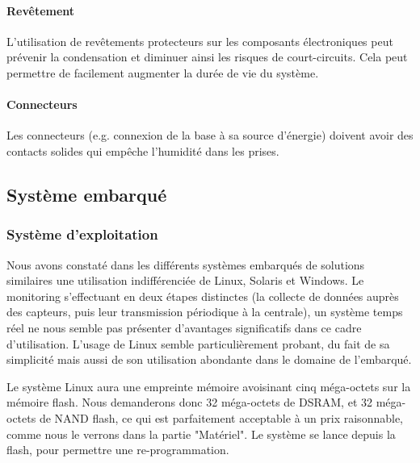\paragraph{Revêtement}

L'utilisation de revêtements protecteurs sur les composants électroniques peut prévenir la condensation et diminuer ainsi les risques de court-circuits. Cela peut permettre de facilement augmenter la durée de vie du système.

\paragraph{Connecteurs}

Les connecteurs (e.g. connexion de la base à sa source d'énergie) doivent avoir des contacts solides qui empêche l’humidité dans les prises.

\subsection{Système embarqué}

\subsubsection{Système d'exploitation}

Nous avons constaté dans les différents systèmes embarqués de solutions similaires une utilisation indifférenciée de Linux, Solaris et Windows\footnotemark. Le monitoring s'effectuant en deux étapes distinctes (la collecte de données auprès des capteurs, puis leur transmission périodique à la centrale), un système temps réel ne nous semble pas présenter d'avantages significatifs dans ce cadre d'utilisation. L'usage de Linux semble particulièrement probant, du fait de sa simplicité mais aussi de son utilisation abondante dans le domaine de l'embarqué.


Le système Linux aura une empreinte mémoire avoisinant cinq méga-octets sur la mémoire flash\footnotemark. Nous demanderons donc 32 méga-octets de DSRAM, et 32 méga-octets de NAND flash, ce qui est parfaitement acceptable à un prix raisonnable, comme nous le verrons dans la partie "Matériel". Le système se lance depuis la flash, pour permettre une re-programmation.


